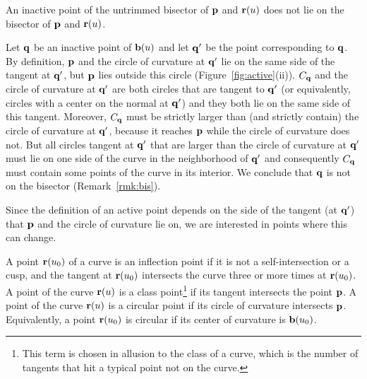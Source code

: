 \begin{propn}
An inactive point of the untrimmed bisector of ${\bf p}$ and ${\bf r}(u)$
does not lie on the bisector of ${\bf p}$ and ${\bf r}(u)$.
\end{propn}
\prf
Let ${\bf q}$ be an inactive point of ${\bf b}(u)$
and let ${\bf q}'$ be the point corresponding to ${\bf q}$.
By definition, ${\bf p}$ and the circle of curvature at ${\bf q}'$ lie
on the same side of the tangent at ${\bf q}'$, but ${\bf p}$ lies outside this
circle (Figure~\ref{fig:active}(ii)).
$C_{\bf q}$ and the circle of curvature at ${\bf q}'$ are both circles that are
tangent to ${\bf q}'$ (or equivalently, circles with a center on the normal at ${\bf q}'$)
and they both lie on the same side of this tangent.
Moreover, $C_{\bf q}$ must be strictly larger than (and strictly contain)
the circle of curvature at ${\bf q}'$, because it reaches ${\bf p}$ while the circle
of curvature does not.
But all circles tangent at ${\bf q}'$ that are larger than the circle of curvature
at ${\bf q}'$ must lie on one side of the curve in the neighborhood of ${\bf q}'$
\cite[p.~176]{H52} and consequently $C_{\bf q}$ must contain some points of the curve
in its interior.
We conclude that ${\bf q}$ is not on the bisector (Remark~\ref{rmk:bis}).
\QED

Since the definition of an active point depends on the side of the tangent
(at ${\bf q}'$) that ${\bf p}$ and the circle of curvature lie on,
we are interested in points where this can change.

\begin{dfn}
\label{d:trim}
A point ${\bf r}(u_{0})$ of a curve is an {\rm inflection} point
if it is not a self-intersection or a cusp, and the tangent at
${\bf r}(u_{0})$ intersects the curve three or more times at ${\bf r}(u_{0})$.
A point of the curve ${\bf r}(u)$ is a {\rm class}
point\footnote{This
        term is chosen in allusion to the class of a curve, which is the
        number of tangents that hit a typical point not on the curve.}
if its tangent intersects the point ${\bf p}$.
A point of the curve ${\bf r}(u)$ is a {\rm circular} point
if its circle of curvature intersects ${\bf p}$.
Equivalently, a point ${\bf r}(u_{0})$ is circular
if its center of curvature is ${\bf b}(u_{0})$.
\end{dfn}

